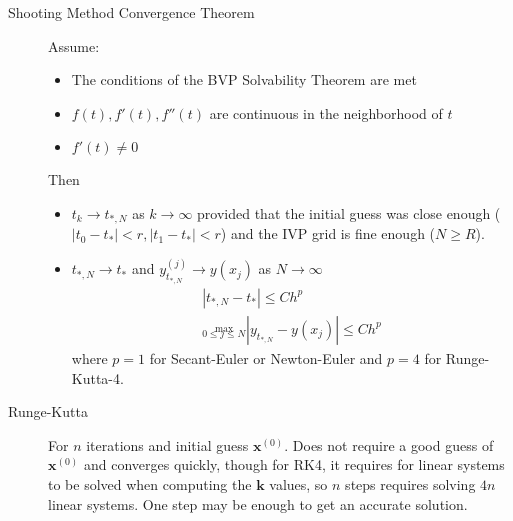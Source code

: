 \documentclass[8pt]{article}
\begin{document}
\begin{multicols}{2}
\begin{description}
  \item[Shooting Method Convergence Theorem]
    Assume:
    \begin{itemize}
    \item The conditions of the BVP Solvability Theorem are met
    \item $f(t), f'(t), f''(t)$ are continuous in the neighborhood of $t$
    \item $f'(t) \neq 0$
    \end{itemize}
    Then 
    \begin{itemize}
    \item $t_k \rightarrow t_{*,N}$ as $k\rightarrow\infty$ provided
      that the initial guess was close enough ($|t_0-t_*|<r,
      |t_1-t_*|<r$) and the IVP grid is fine enough ($N\geq R$).
    \item $t_{*,N} \rightarrow t_*$ and $y_{t_{*,N}}^{(j)} \rightarrow
      y(x_{j})$ as $N\rightarrow\infty$
        \begin{gather*}
          |t_{*,N}-t_*| \leq Ch^p \\
          \stackrel{\text{max}}{_{0\leq j\leq N}}  |y_{t_{*,N}}-y(x_j)| \leq Ch^p
        \end{gather*}
      where $p=1$ for Secant-Euler or Newton-Euler and $p=4$ for
      Runge-Kutta-4.
    \end{itemize}

  \item[Runge-Kutta] For $n$ iterations and initial guess $\mathbf{x}^{(0)}$. Does not require a
    good guess of $\mathbf{x}^{(0)}$ and converges quickly, though for RK4, it requires for linear
    systems to be solved when computing the $\mathbf{k}$ values, so $n$ steps requires solving
    $4n$ linear systems. One step may be enough to get an accurate solution.


\end{description}
\end{multicols}
\end{document}
